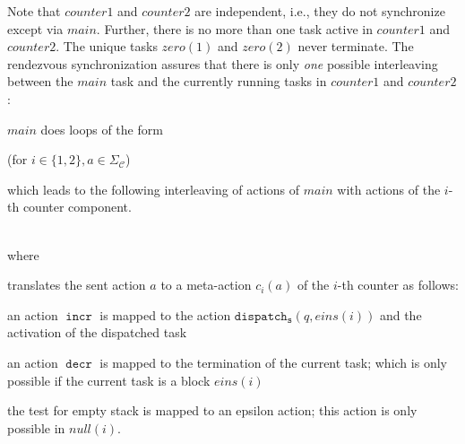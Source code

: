 \documentclass[runningheads,oribibl,]{article}
\newcommand{\Cc}{\ensuremath{\mathcal{C}}\xspace}
\newcommand{\cfont}[1]{\ensuremath{\mathtt{#1}}\xspace}
\newcommand{\main}{\ensuremath{\textit{main}}\xspace}
\DeclareMathOperator{\incr}{\cfont{incr}}
\DeclareMathOperator{\decr}{\cfont{decr}}
\newcommand{\disps}{\ensuremath{\cfont{dispatch_s}}}
\newenvironment{myitemize}{\begin{list}{\labelitemi}{\setlength{\topsep}{4pt}\setlength{\partopsep}{0pt}
\setlength{\itemsep}{0pt}
\setlength{\itemindent}{0ex}
\setlength{\listparindent}{0ex}
\setlength{\leftmargin}{4ex}\setlength{\labelwidth}{2ex}
}}
{\end{list}}
\begin{document}
Note that $counter1$ and $counter2$ are independent, i.e., they do not
synchronize except via $\main$. Further, there is no more than one task active
in $counter1$ and $counter2$. The unique tasks $zero(1)$ and $zero(2)$
never terminate. The rendezvous synchronization assures that there is only
\emph{one} possible interleaving between the \main task and the currently running
tasks in $counter1$ and $counter2$:
\begin{myitemize}
  \item \main does loops of the form\\
\hfill (for $i\in \{1,2\},a\in\Sigma_\Cc$)\\

  \item which leads to the following interleaving of actions of \main
    with actions of the $i$-th counter component.\\
\\

where
translates the sent action $a$ to a meta-action $c_i(a)$ of the $i$-th counter
as follows:\\
\begin{myitemize}
  \item an action $\incr$ is mapped to the action
    $\disps(q,eins(i))$ and the activation of the dispatched task
  \item an action $\decr$ is mapped to the termination of
    the current task; which is only possible if the current task
    is a block $eins(i)$
  \item the test for empty stack is mapped to an epsilon action; this action
    is only possible in $null(i)$.
\end{myitemize}
\end{myitemize}
\end{document}
